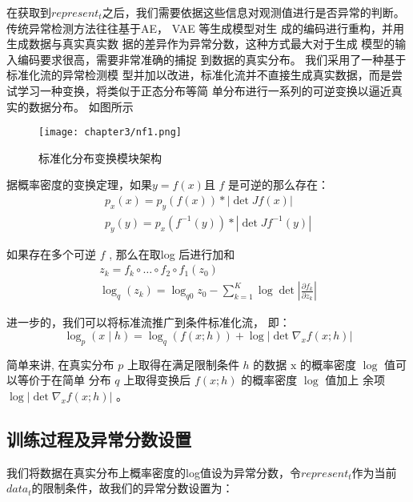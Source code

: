   在获取到$represent_t$之后，我们需要依据这些信息对观测值进行是否异常的判断。传统异常检测方法往往基于AE， VAE 等生成模型对生 成的编码进行重构，并用生成数据与真实真实数 据的差异作为异常分数，这种方式最大对于生成 模型的输入编码要求很高，需要非常准确的捕捉 到数据的真实分布。
  我们采用了一种基于标准化流的异常检测模 型并加以改进，标准化流并不直接生成真实数据，而是尝试学习一种变换，将类似于正态分布等简 单分布进行一系列的可逆变换以逼近真实的数据分布。
  如图所示
  
  \begin{figure}[ht]
    \centering
    \texttt{[image: chapter3/nf1.png]}
    \caption{标准化分布变换模块架构}
    \end{figure}
  
  据概率密度的变换定理，如果$y =f(x) $且 $f$ 是可逆的那么存在：
  \begin{equation}
    \begin{gathered}
    p_x(x)=p_y(f(x)) *|\operatorname{det} J f(x)| \\
    p_y(y)=p_x\left(f^{-1}(y)\right) *\left|\operatorname{det} J f^{-1}(y)\right|
    \end{gathered}
    \end{equation}
  
  如果存在多个可逆 $f$ , 那么在取log 后进行加和
    \begin{equation}
      \begin{gathered}
      z_k=f_k \circ \ldots \circ f_2 \circ f_1\left(z_0\right) \\
      \log _q\left(z_k\right)=\log _{q 0} z_0-\sum_{k=1}^K \log \operatorname{det}\left|\frac{\partial f_k}{\partial z_k}\right|
      \end{gathered}
      \end{equation}
  
  进一步的，我们可以将标准流推广到条件标准化流， 即：
  \begin{equation}
    \log _p(x \mid h)=\log _q(f(x ; h))+\log \left|\operatorname{det} \nabla_x f(x ; h)\right|
    \end{equation}
  
  简单来讲, 在真实分布 $p$ 上取得在满足限制条件 $h$ 的数据 $\mathrm{x}$ 的概率密度 $\log$ 值可以等价于在简单 分布 $q$ 上取得变换后 $f(x ; h)$ 的概率密度 $\log$ 值加上 余项 $\log \left|\operatorname{det} \nabla_x f(x ; h)\right|$ 。
  
  \subsection{训练过程及异常分数设置}
  我们将数据在真实分布上概率密度的log值设为异常分数，令$represent_t$作为当前$data_t$的限制条件，故我们的异常分数设置为：
  
